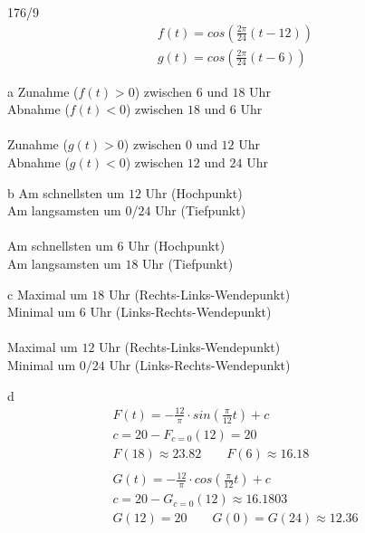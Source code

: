 \begin{exercise}{176/9}
  \begin{gather*}
    f(t) = cos(\frac{2\pi}{24}(t - 12)) \\
    g(t) = cos(\frac{2\pi}{24}(t - 6))
  \end{gather*}
  \item [a]
  Zunahme ($f(t) > 0$) zwischen $6$ und $18$ Uhr \\
  Abnahme ($f(t) < 0$) zwischen $18$ und $6$ Uhr \\\\
  Zunahme ($g(t) > 0$) zwischen $0$ und $12$ Uhr \\
  Abnahme ($g(t) < 0$) zwischen $12$ und $24$ Uhr
  \item [b]
  Am schnellsten um $12$ Uhr (Hochpunkt) \\
  Am langsamsten um $0$/$24$ Uhr (Tiefpunkt) \\\\
  Am schnellsten um $6$ Uhr (Hochpunkt) \\
  Am langsamsten um $18$ Uhr (Tiefpunkt)
  \item [c]
  Maximal um $18$ Uhr (Rechts-Links-Wendepunkt) \\
  Minimal um $6$ Uhr (Links-Rechts-Wendepunkt) \\\\
  Maximal um $12$ Uhr (Rechts-Links-Wendepunkt) \\
  Minimal um $0/24$ Uhr (Links-Rechts-Wendepunkt)
  \item [d]
  \begin{gather*}
    F(t) = -\frac{12}{\pi} \cdot sin(\frac{\pi}{12}t) + c \\
    c = 20 - F_{c=0}(12) = 20 \\
    F(18) \approx 23.82 \qquad F(6) \approx 16.18 \\\\
    G(t) = -\frac{12}{\pi} \cdot cos(\frac{\pi}{12}t) + c \\
    c = 20 - G_{c=0}(12) \approx 16.1803 \\
    G(12) = 20 \qquad G(0) = G(24) \approx 12.36
  \end{gather*}
\end{exercise}
